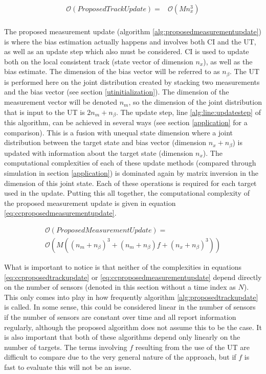 \documentclass[journal]{IEEEtran}
\begin{document}
\begin{equation}
\begin{aligned}
    \mathcal{O}(ProposedTrackUpdate) ={}& \mathcal{O}(M n_{x}^3) \\
\end{aligned} \label{eq:ccproposedtrackupdate}
\end{equation}

The proposed measurement update (algorithm \ref{alg:proposedmeasurementupdate}) is where the bias estimation actually happens and involves both CI and the UT, as well as an update step which also must be considered. CI is used to update both on the local consistent track (state vector of dimension $n_{x}$), as well as the bias estimate. The dimension of the bias vector will be referred to as $n_{\beta}$. The UT is performed here on the joint distribution created by stacking two measurements and the bias vector (see section \ref{utinitialization}). The dimension of the measurement vector will be denoted $n_{m}$, so the dimension of the joint distribution that is input to the UT is $2n_{m} + n_{\beta}$. The update step, line \ref{alg:line:updatestep} of this algorithm, can be achieved in several ways (see section \ref{application} for a comparison). This is a fusion with unequal state dimension where a joint distribution between the target state and bias vector (dimension $n_{x} + n_{\beta}$) is updated with information about the target state (dimension $n_{x}$). The computational complexities of each of these update methods (compared through simulation in section \ref{application}) is dominated again by matrix inversion in the dimension of this joint state. Each of these operations is required for each target used in the update. Putting this all together, the computational complexity of the proposed measurement update is given in equation \ref{eq:ccproposedmeasurementupdate}.

\begin{multline}
    \mathcal{O}(ProposedMeasurementUpdate) =\\
    \mathcal{O}(M((n_{m} +n_{\beta})^3 + (n_{m} +n_{\beta})f + (n_{x} + n_{\beta})^3))
\label{eq:ccproposedmeasurementupdate}
\end{multline}

What is important to notice is that neither of the complexities in equations \ref{eq:ccproposedtrackupdate} or \ref{eq:ccproposedmeasurementupdate} depend directly on the number of sensors (denoted in this section without a time index as $N$). This only comes into play in how frequently algorithm \ref{alg:proposedtrackupdate} is called. In some sense, this could be considered linear in the number of sensors if the number of sensors are constant over time and all report information regularly, although the proposed algorithm does not assume this to be the case. It is also important that both of these algorithms depend only linearly on the number of targets. The terms involving $f$ resulting from the use of the UT are difficult to compare due to the very general nature of the approach, but if $f$ is fast to evaluate this will not be an issue.
\end{document}
